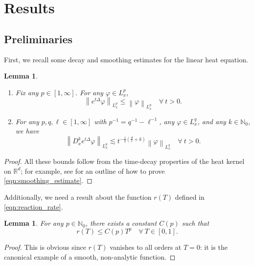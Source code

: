 \documentclass[twosided, 12pt]{article}
\numberwithin{equation}{section}
\theoremstyle{plain}
\newtheorem{lemma}[thm]{Lemma}
\begin{document}
\section{Results}
\subsection{Preliminaries}
\noindent First, we recall some decay and smoothing estimates for the linear heat equation.
\begin{lemma}\label{lemma:heat_flow_est}
\par \noindent
   \begin{enumerate}
       \item Fix any $p\in [1,\infty]$. For any $\varphi\in L^p_{x}$,
    \begin{equation}\label{eqn:weak_damping_estimate}
        \left\|e^{t\Delta}\varphi\right\|_{L^p_{x}} \leq \left\|\varphi\right\|_{L^p_{x}} \quad \forall \ t>0. 
    \end{equation}
    \item For any $p,q,\ell\in \left[1,\infty\right]$ with $p^{-1}=q^{-1}-\ell^{-1}$, any $\varphi\in L^q_{x}$, and any $k\in \mathbb{N}_0$, we have 
    \begin{equation}\label{eqn:smoothing_estimate}
        \left\|D^{k}_{x} e^{t\Delta}\varphi\right\|_{L^p_x} \lesssim t^{-\frac12\left(\frac{d}{\ell}+k\right)}\left\|\varphi\right\|_{L^q_{x}}  \quad \forall \ t>0. 
    \end{equation}
   \end{enumerate} 
\end{lemma}
\begin{proof}
All these bounds follow from the time-decay properties of the heat kernel on $\mathbb{R}^d$; for example, see \cite[pp. 41-42]{LP2015} for an outline of how to prove \eqref{eqn:smoothing_estimate}.  
\end{proof}

 \noindent Additionally, we need a result about the function $r(T)$ defined in \eqref{eqn:reaction_rate}.
\begin{lemma}\label{lemma:reaction_rate}
    For any $p\in \mathbb{N}_0$, there exists a constant $C(p)$ such that 
    $$
    r(T) \leq C(p) T^{p} \quad \forall \ T\in [0,1].
    $$
\end{lemma}
\begin{proof}
    This is obvious since $r(T)$ vanishes to all orders at $T=0$: it is the canonical example of a smooth, non-analytic function. 
\end{proof}
\end{document}
